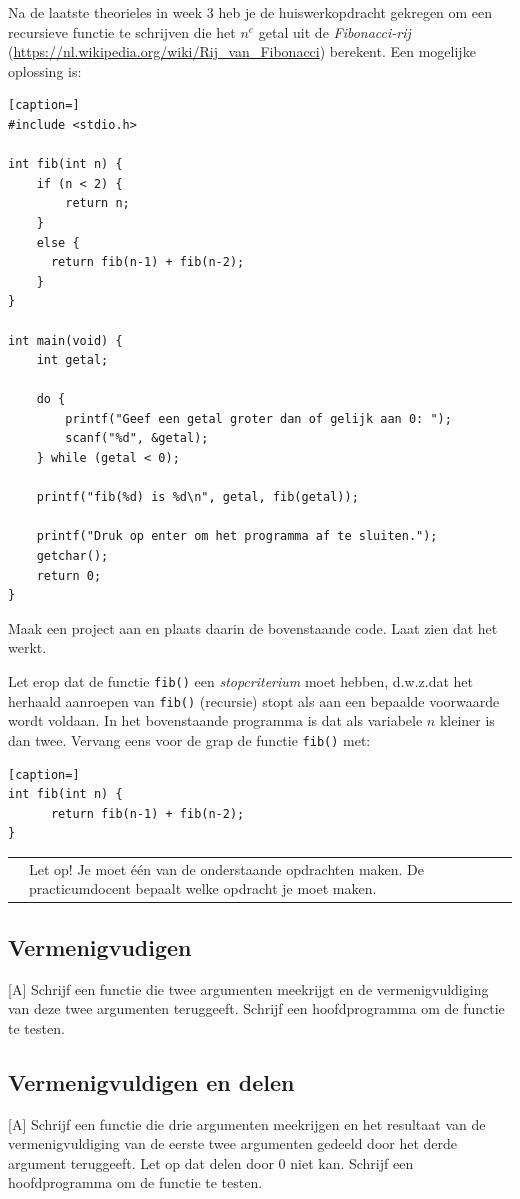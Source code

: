 \documentclass[a4paper,10pt,fleqn,twoside]{article}
\newcommand{\letop}{%
\vspace{4ex plus 1ex minus 1ex}
\begin{mdframed}[outerlinewidth = 1 ,%
roundcorner = 4 pt,%
leftmargin = 40,%
rightmargin = 40,%
backgroundcolor = yellow!40,%
outerlinecolor = red!70!black,%
innertopmargin = \topskip,%
splittopskip = \topskip,%
]
\begin{tabularx}{\linewidth}{m{1cm}X}
\Large\leftpointright & Let op! Je moet één van de onderstaande opdrachten maken. De practicumdocent bepaalt welke opdracht je moet maken.
\end{tabularx}
\end{mdframed}
\vspace{4ex plus 1ex minus 1ex}
}
\begin{document}
Na de laatste theorieles in week 3 heb je de huiswerkopdracht gekregen om een recursieve functie te schrijven die het $n^e$ getal uit de \textsl{Fibonacci-rij} (\url{https://nl.wikipedia.org/wiki/Rij_van_Fibonacci}) berekent. Een mogelijke oplossing is:

\begin{lstlisting}[caption=]
#include <stdio.h>

int fib(int n) {
    if (n < 2) {
        return n;
	}
	else {
	  return fib(n-1) + fib(n-2);
	}
} 

int main(void) {
    int getal;

    do {
        printf("Geef een getal groter dan of gelijk aan 0: ");
        scanf("%d", &getal);
    } while (getal < 0);

    printf("fib(%d) is %d\n", getal, fib(getal));

    printf("Druk op enter om het programma af te sluiten.");
    getchar();
    return 0;
}
\end{lstlisting}

Maak een project aan en plaats daarin de bovenstaande code. Laat zien dat het werkt.

Let erop dat de functie \lstinline|fib()| een \textsl{stopcriterium} moet hebben, d.w.z.\@ dat het herhaald aanroepen van \lstinline|fib()| (recursie) stopt als aan een bepaalde voorwaarde wordt voldaan. In het bovenstaande programma is dat als variabele $n$ kleiner is dan twee. Vervang eens voor de grap de functie \lstinline|fib()| met:

\begin{lstlisting}[caption=]
int fib(int n) {
      return fib(n-1) + fib(n-2);
} 
\end{lstlisting}

\letop
\clearpage


\subsection{Vermenigvudigen}[A]
Schrijf een functie die twee argumenten meekrijgt en de vermenigvuldiging van deze twee argumenten teruggeeft. Schrijf een hoofdprogramma om de functie te testen.

\subsection{Vermenigvuldigen en delen}[A]
Schrijf een functie die drie argumenten meekrijgen en het resultaat van de vermenigvuldiging van de eerste twee argumenten gedeeld door het derde argument teruggeeft. Let op dat delen door 0 niet kan. Schrijf een hoofdprogramma om de functie te testen.
\end{document}
